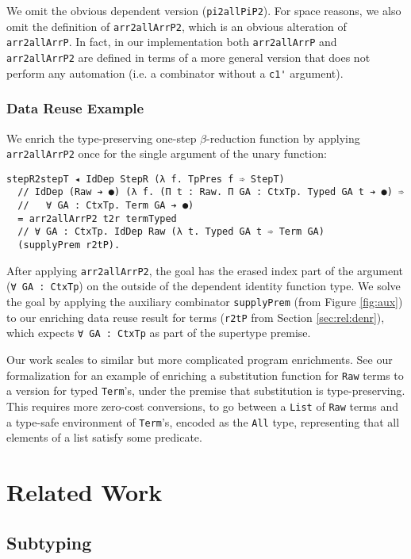\documentclass[acmsmall,screen]{acmart}
\newcommand{\refsec}[1]{Section \ref{sec:#1}}
\newcommand{\labsec}[1]{\label{sec:#1}}
\newcommand{\reffig}[1]{Figure \ref{fig:#1}}
\begin{document}
We omit the obvious dependent version (\verb;pi2allPiP2;). For space
reasons, we also omit the definition of \verb;arr2allArrP2;, which is
an obvious alteration of \verb;arr2allArrP;. In fact, in our
implementation both \verb;arr2allArrP; and \verb;arr2allArrP2; are
defined in terms of a more general version that does not perform any
automation (i.e. a combinator without a \verb;c1'; argument).

\subsubsection{Data Reuse Example}

We enrich the type-preserving one-step $\beta$-reduction function
by applying \verb;arr2allArrP2; once for the single
argument of the unary function:
\begin{verbatim}
stepR2stepT ◂ IdDep StepR (λ f. TpPres f ➾ StepT)
  // IdDep (Raw ➔ ●) (λ f. (Π t : Raw. Π GA : CtxTp. Typed GA t ➔ ●) ➾
  //   ∀ GA : CtxTp. Term GA ➔ ●)
  = arr2allArrP2 t2r termTyped
  // ∀ GA : CtxTp. IdDep Raw (λ t. Typed GA t ➾ Term GA)
  (supplyPrem r2tP).
\end{verbatim}
After applying \verb;arr2allArrP2;, the goal has the erased index part
of the argument (\verb;∀ GA : CtxTp;) on the outside of the dependent
identity function type. We solve the goal by applying the auxiliary
combinator \verb;supplyPrem; (from \reffig{aux}) to our enriching
data reuse result for terms (\verb;r2tP; from \refsec{rel:denr}),
which expects \verb;∀ GA : CtxTp; as part of the supertype premise.

Our work scales to similar but more complicated program
enrichments. See our formalization for an example of enriching a
substitution function for \verb;Raw; terms to a version for typed \verb;Term;'s,
under the premise that substitution is type-preserving. This
requires more zero-cost conversions, to go between a \verb;List; of
\verb;Raw; terms and a type-safe environment of \verb;Term;'s,
encoded as the \verb;All; type, representing that all elements of a
list satisfy some predicate.

\section{Related Work}
\labsec{others}

\subsection{Subtyping}
\labsec{others:judg}
\end{document}
